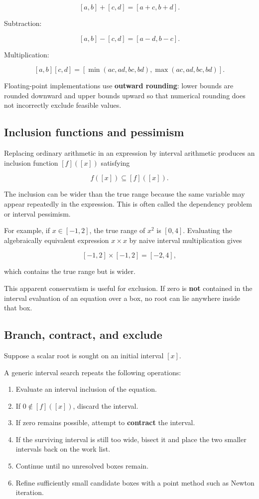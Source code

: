 \documentclass[11pt]{article}
\providecommand{\tightlist}{%
      \setlength{\itemsep}{0pt}\setlength{\parskip}{0pt}}
\begin{document}
\[
[a,b]+[c,d]=[a+c,b+d].
\]

Subtraction:

\[
[a,b]-[c,d]=[a-d,b-c].
\]

Multiplication:

\[
[a,b][c,d]
=
[\min(ac,ad,bc,bd),\max(ac,ad,bc,bd)].
\]

Floating-point implementations use \textbf{outward rounding}: lower
bounds are rounded downward and upper bounds upward so that numerical
rounding does not incorrectly exclude feasible values.

    \subsection{Inclusion functions and
pessimism}\label{inclusion-functions-and-pessimism}

Replacing ordinary arithmetic in an expression by interval arithmetic
produces an inclusion function \([f]([x])\) satisfying

\[
f([x])\subseteq [f]([x]).
\]

The inclusion can be wider than the true range because the same variable
may appear repeatedly in the expression. This is often called the
dependency problem or interval pessimism.

For example, if \(x\in[-1,2]\), the true range of \(x^2\) is \([0,4]\).
Evaluating the algebraically equivalent expression \(x\times x\) by
naive interval multiplication gives

\[
[-1,2]\times[-1,2]=[-2,4],
\]

which contains the true range but is wider.

This apparent conservatism is useful for exclusion. If zero is
\textbf{not} contained in the interval evaluation of an equation over a
box, no root can lie anywhere inside that box.

    \subsection{Branch, contract, and
exclude}\label{branch-contract-and-exclude}

Suppose a scalar root is sought on an initial interval \([x]\).

A generic interval search repeats the following operations:

\begin{enumerate}
\def\labelenumi{\arabic{enumi}.}
\tightlist
\item
  Evaluate an interval inclusion of the equation.
\item
  If \(0\notin[f]([x])\), discard the interval.
\item
  If zero remains possible, attempt to \textbf{contract} the interval.
\item
  If the surviving interval is still too wide, bisect it and place the
  two smaller intervals back on the work list.
\item
  Continue until no unresolved boxes remain.
\item
  Refine sufficiently small candidate boxes with a point method such as
  Newton iteration.
\end{enumerate}
\end{document}
